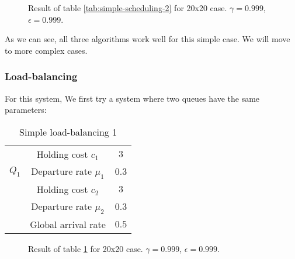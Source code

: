 \documentclass[
  a4paper, xcolor = usenames,dvipsnames]{article}
\theoremstyle{definition}
\theoremstyle{definition}
\theoremstyle{definition}
\theoremstyle{definition}
\theoremstyle{remark}
\begin{document}
\begin{figure}

{\centering {}

}

\caption{Result of table \ref{tab:simple-scheduling-2} for 20x20 case. \(\gamma = 0.999\), \(\epsilon = 0.999\).}\label{fig:20x20-simple-scheduling-2}
\end{figure}

As we can see, all three algorithms work well for this simple case. We will move to more complex cases.

\hypertarget{load-balancing}{%
\subsubsection{Load-balancing}\label{load-balancing}}

For this system, We first try a system where two queues have the same parameters:

\begin{table}[!htbp]
\caption{Simple load-balancing 1}
\begin{center}
\begin{tabular}{c c c}
    \hline
    \multirow{3}{*}{$Q_{1}$} & Holding cost $c_{1}$ & $3$ \\
    & Departure rate $\mu_{1}$ & $0.3$ \\
    \cline{2-3}
    \multirow{3}{*}{$Q_{2}$} & Holding cost $c_{2}$ & $3$ \\
    & Departure rate $\mu_{2}$ & $0.3$ \\
    \cline{2-3}
    & Global arrival rate & $0.5$ \\    
    \hline
\end{tabular}
\end{center}
\label{tab:simple-lb-1}
\end{table}



\begin{figure}

{\centering {}

}

\caption{Result of table \ref{tab:simple-lb-1} for 20x20 case. \(\gamma = 0.999\), \(\epsilon = 0.999\).}\label{fig:20x20-simple-lb-1}
\end{figure}
\end{document}

